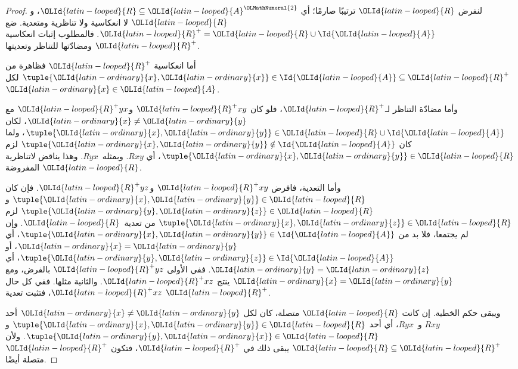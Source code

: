 \documentclass[../../../include/open-logic-section]{subfiles}
\begin{document}
\begin{proof}
لنفرض ${\OLId{latin-looped}{R}}$ ترتيبًا صارمًا؛ أي ${\OLId{latin-looped}{R}} \subseteq {\OLId{latin-looped}{A}}^{\OLMathNumeral{2}}$، و${\OLId{latin-looped}{R}}$ لا انعكاسية
ولا تناظرية ومتعدية. ضع ${\OLId{latin-looped}{R}}^+ = {\OLId{latin-looped}{R}} \cup \Id{{\OLId{latin-looped}{A}}}$. فالمطلوب إثبات
انعكاسية ${\OLId{latin-looped}{R}}^+$ ومضادّتها للتناظر وتعديتها.

أما انعكاسية ${\OLId{latin-looped}{R}}^+$ فظاهرة من $\tuple{{\OLId{latin-ordinary}{x}}, {\OLId{latin-ordinary}{x}}} \in \Id{{\OLId{latin-looped}{A}}} \subseteq
{\OLId{latin-looped}{R}}^+$ لكل ${\OLId{latin-ordinary}{x}} \in {\OLId{latin-looped}{A}}$.

وأما مضادّة التناظر لـ${\OLId{latin-looped}{R}}^+$، فلو كان ${\OLId{latin-looped}{R}}^+xy$ و${\OLId{latin-looped}{R}}^+yx$ مع
${\OLId{latin-ordinary}{x}} \neq {\OLId{latin-ordinary}{y}}$، لكان $\tuple{{\OLId{latin-ordinary}{x}},{\OLId{latin-ordinary}{y}}} \in {\OLId{latin-looped}{R}} \cup \Id{{\OLId{latin-looped}{A}}}$، ولما كان
$\tuple{{\OLId{latin-ordinary}{x}}, {\OLId{latin-ordinary}{y}}} \notin \Id{{\OLId{latin-looped}{A}}}$ لزم $\tuple{{\OLId{latin-ordinary}{x}}, {\OLId{latin-ordinary}{y}}} \in {\OLId{latin-looped}{R}}$، أي
$Rxy$. وبمثله~$Ryx$. وهذا يناقض لاتناظرية ${\OLId{latin-looped}{R}}$ المفروضة.

وأما التعدية، فافرض ${\OLId{latin-looped}{R}}^+xy$ و${\OLId{latin-looped}{R}}^+yz$. فإن كان
$\tuple{{\OLId{latin-ordinary}{x}}, {\OLId{latin-ordinary}{y}}} \in {\OLId{latin-looped}{R}}$ و$\tuple{{\OLId{latin-ordinary}{y}},{\OLId{latin-ordinary}{z}}} \in {\OLId{latin-looped}{R}}$ لزم $\tuple{{\OLId{latin-ordinary}{x}}, {\OLId{latin-ordinary}{z}}} \in
{\OLId{latin-looped}{R}}$ من تعدية~${\OLId{latin-looped}{R}}$. وإن لم يجتمعا، فلا بد من
$\tuple{{\OLId{latin-ordinary}{x}}, {\OLId{latin-ordinary}{y}}} \in \Id{{\OLId{latin-looped}{A}}}$، أي ${\OLId{latin-ordinary}{x}} = {\OLId{latin-ordinary}{y}}$، أو $\tuple{{\OLId{latin-ordinary}{y}}, {\OLId{latin-ordinary}{z}}} \in \Id{{\OLId{latin-looped}{A}}}$،
أي ${\OLId{latin-ordinary}{y}} = {\OLId{latin-ordinary}{z}}$. ففي الأولى ${\OLId{latin-looped}{R}}^+yz$ بالفرض، ومع ${\OLId{latin-ordinary}{x}} = {\OLId{latin-ordinary}{y}}$ ينتج
${\OLId{latin-looped}{R}}^+xz$. والثانية مثلها. ففي كل حال ${\OLId{latin-looped}{R}}^+xz$، فتثبت تعدية ${\OLId{latin-looped}{R}}^+$.

ويبقى حكم الخطية. إن كانت ${\OLId{latin-looped}{R}}$ متصلة، كان لكل ${\OLId{latin-ordinary}{x}} \neq {\OLId{latin-ordinary}{y}}$ أحد
$Rxy$ و~$Ryx$، أي أحد $\tuple{{\OLId{latin-ordinary}{x}}, {\OLId{latin-ordinary}{y}}} \in {\OLId{latin-looped}{R}}$ و$\tuple{{\OLId{latin-ordinary}{y}}, {\OLId{latin-ordinary}{x}}} \in {\OLId{latin-looped}{R}}$.
ولأن ${\OLId{latin-looped}{R}} \subseteq {\OLId{latin-looped}{R}}^+$ يبقى ذلك في ${\OLId{latin-looped}{R}}^+$، فتكون ${\OLId{latin-looped}{R}}^+$ متصلة أيضًا.
\end{proof}
\end{document}
